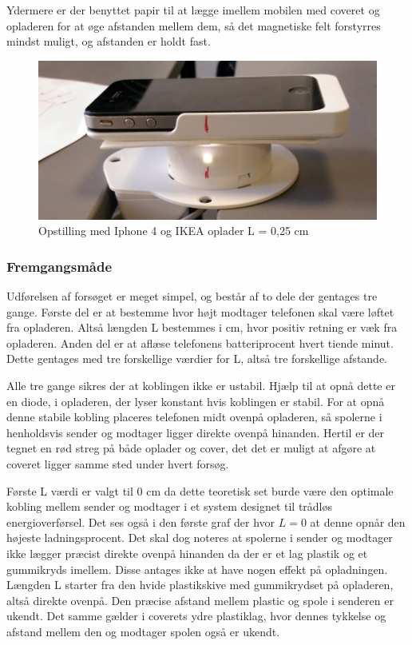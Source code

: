 Ydermere er der benyttet papir til at lægge imellem mobilen med coveret og opladeren for at øge afstanden mellem dem, så det magnetiske felt forstyrres mindst muligt, og afstanden er holdt fast. 

\begin{figure}
\includegraphics[width=1\textwidth]{Vildledning/Schematics/forsg2_opstilling1}
\caption{Opstilling med Iphone 4 og IKEA oplader L = 0,25 cm}
\label{figure:opstilling}
\end{figure}

\subsubsection{Fremgangsmåde}

Udførelsen af forsøget er meget simpel, og består af to dele der gentages tre gange. Første del er at bestemme hvor højt modtager telefonen skal være løftet fra opladeren. Altså længden L bestemmes i cm, hvor positiv retning er væk fra opladeren. Anden del er at aflæse telefonens batteriprocent hvert tiende minut. Dette gentages med tre forskellige værdier for L, altså tre forskellige afstande.

Alle tre gange sikres der at koblingen ikke er ustabil. Hjælp til at opnå dette er en diode, i opladeren, der lyser konstant hvis koblingen er stabil. For at opnå denne stabile kobling placeres telefonen midt ovenpå opladeren, så spolerne i henholdsvis sender og modtager ligger direkte ovenpå hinanden. Hertil er der tegnet en rød streg på både oplader og cover, det det er muligt at afgøre at coveret ligger samme sted under hvert forsøg.

Første L værdi er valgt til 0 cm da dette teoretisk set burde være den optimale kobling mellem sender og modtager i et system designet til trådløs energioverførsel. Det ses også i den første graf der hvor $L = 0$ at denne opnår den højeste ladningsprocent. Det skal dog noteres at spolerne i sender og modtager ikke lægger præcist direkte ovenpå hinanden da der er et lag plastik og et gummikryds imellem. Disse antages ikke at have nogen effekt på opladningen. Længden L starter fra den hvide plastikskive med gummikrydset på opladeren, altså direkte ovenpå. Den præcise afstand mellem plastic og spole i senderen er ukendt. Det samme gælder i coverets ydre plastiklag, hvor dennes tykkelse og afstand mellem den og modtager spolen også er ukendt.

